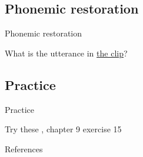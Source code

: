 \documentclass{beamer}
\newcommand{\suboneeight}{Phonemic restoration}
\newcommand{\subonenine}{Practice}
\begin{document}
    \subsection{\suboneeight}
      \begin{frame}{\suboneeight}
        \begin{definition}
           \parencite{warren_perceptual_1970}
        \end{definition}
        \begin{example}
          What is the utterance in \href{http://sites.sinauer.com/languageinmind/wa07.08.html}{the clip}?
        \end{example}
      \end{frame}

    \subsection{\subonenine}
      \begin{frame}{\subonenine}
        \begin{block}{Try these}
          \textcite{dawson_language_2016}, chapter 9 exercise 15
        \end{block}
      \end{frame}

      \begin{frame}{References}
        \printbibliography
      \end{frame}
\end{document}
